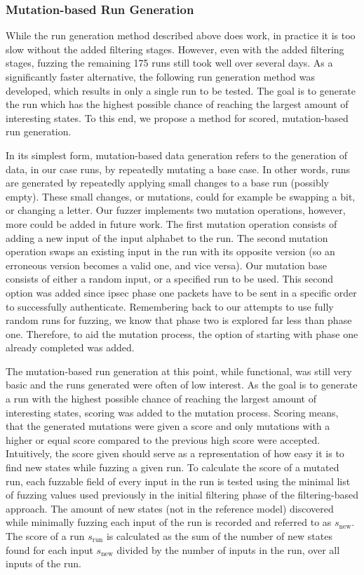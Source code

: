 \subsubsection{Mutation-based Run Generation} \label{subsubsec:mutations}
While the run generation method described above does work, in practice it is too slow without the added filtering stages. However, even with the added filtering stages, fuzzing the remaining 175 runs still took well over several days. As a significantly faster alternative, the following run generation method was developed, which results in only a single run to be tested. The goal is to generate the run which has the highest possible chance of reaching the largest amount of interesting states. To this end, we propose a method for scored, mutation-based run generation. 

In its simplest form, mutation-based data generation refers to the generation of data, in our case runs, by repeatedly mutating a base case. In other words, runs are generated by repeatedly applying small changes to a base run (possibly empty). These small changes, or mutations, could for example be swapping a bit, or changing a letter. Our fuzzer implements two mutation operations, however, more could be added in future work. The first mutation operation consists of adding a new input of the input alphabet to the run. The second mutation operation swaps an existing input in the run with its opposite version (so an erroneous version becomes a valid one, and vice versa). Our mutation base consists of either a random input, or a specified run to be used. This second option was added since \ac{ipsec} phase one packets have to be sent in a specific order to successfully authenticate. Remembering back to our attempts to use fully random runs for fuzzing, we know that phase two is explored far less than phase one. Therefore, to aid the mutation process, the option of starting with phase one already completed was added.

The mutation-based run generation at this point, while functional, was still very basic and the runs generated were often of low interest. As the goal is to generate a run with the highest possible chance of reaching the largest amount of interesting states, scoring was added to the mutation process. Scoring means, that the generated mutations were given a score and only mutations with a higher or equal score compared to the previous high score were accepted. Intuitively, the score given should serve as a representation of how easy it is to find new states while fuzzing a given run. To calculate the score of a mutated run, each fuzzable field of every input in the run is tested using the minimal list of fuzzing values used previously in the initial filtering phase of the filtering-based approach. The amount of new states (not in the reference model) discovered while minimally fuzzing each input of the run is recorded and referred to as $s_\mathrm{new}$. The score of a run $s_\mathrm{run}$ is calculated as the sum of the number of new states found for each input $s_\mathrm{new}$ divided by the number of inputs in the run, over all inputs of the run.

